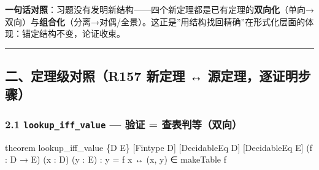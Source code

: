\documentclass[
]{article}
\newenvironment{Shaded}{}{}
\newcommand{\NormalTok}[1]{#1}
\begin{document}
\textbf{一句话对照}：习题没有发明新结构------四个新定理都是已有定理的\textbf{双向化}（单向→双向）与\textbf{组合化}（分离→对偶/全景）。这正是''用结构找回精确''在形式化层面的体现：锚定结构不变，论证收束。

\begin{center}\rule{0.5\linewidth}{0.5pt}\end{center}

\subsection{二、定理级对照（R157 新定理 ↔
源定理，逐证明步骤）}\label{ux4e8cux5b9aux7406ux7ea7ux5bf9ux7167r157-ux65b0ux5b9aux7406-ux6e90ux5b9aux7406ux9010ux8bc1ux660eux6b65ux9aa4}

\subsubsection{\texorpdfstring{2.1 \texttt{lookup\_iff\_value} --- 验证
=
查表判等（双向）}{2.1 lookup\_iff\_value --- 验证 = 查表判等（双向）}}\label{lookup_iff_value-ux9a8cux8bc1-ux67e5ux8868ux5224ux7b49ux53ccux5411}

\begin{Shaded}
\begin{Highlighting}[]
\NormalTok{theorem lookup\_iff\_value \{D E\} [Fintype D] [DecidableEq D] [DecidableEq E]}
\NormalTok{ (f : D → E) (x : D) (y : E) : y = f x ↔ (x, y) ∈ makeTable f}
\end{Highlighting}
\end{Shaded}
\end{document}
